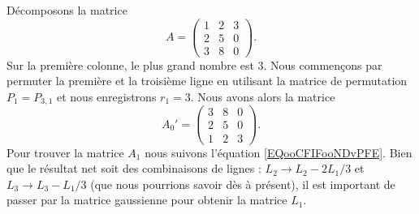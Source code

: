 \begin{example}     \label{EXooAZTDooTUXZJb}
	Décomposons la matrice
	\begin{equation}
		A=\begin{pmatrix}
			1 & 2 & 3 \\
			2 & 5 & 0 \\
			3 & 8 & 0
		\end{pmatrix}.
	\end{equation}
	Sur la première colonne, le plus grand nombre est \( 3\). Nous commençons par permuter la première et la troisième ligne en utilisant la matrice de permutation \( P_1=P_{3,1}\) et nous enregistrons \( r_1=3\). Nous avons alors la matrice
	\begin{equation}        \label{EQooJCCLooOZVajj}
		A_0'=\begin{pmatrix}
			3 & 8 & 0 \\
			2 & 5 & 0 \\
			1 & 2 & 3
		\end{pmatrix}.
	\end{equation}
	Pour trouver la matrice \( A_1\) nous suivons l'équation \eqref{EQooCFIFooNDvPFE}. Bien que le résultat net soit des combinaisons de lignes : \( L_2\to L_2-2L_1/3\) et \( L_3\to L_3-L_1/3\) (que nous pourrions savoir dès à présent), il est important de passer par la matrice gaussienne pour obtenir la matrice \( L_1\).


\end{example}
